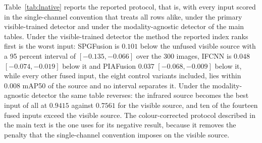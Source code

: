 \documentclass[11pt,a4paper]{article}
\begin{document}
Table~\ref{tab:lnative} reports the reported protocol, that is, with every input scored
in the single-channel convention that treats all rows alike, under the primary
visible-trained detector and under the modality-agnostic detector of the main tables.
Under the visible-trained detector the method the reported index ranks first is the
worst input: SPGFusion is $0.101$ below the unfused visible source with a 95 percent
interval of $[-0.135,-0.066]$ over the 300 images, IFCNN is $0.048$
$[-0.074,-0.019]$ below it and PIAFusion $0.037$ $[-0.068,-0.009]$ below it, while
every other fused input, the eight control variants included, lies within $0.008$
mAP50 of the source and no interval separates it. Under the modality-agnostic detector
the same table reverses: the infrared source becomes the best input of all at $0.9415$
against $0.7561$ for the visible source, and ten of the fourteen fused inputs exceed
the visible source. The colour-corrected protocol described in the main text is the one
uses for its negative result, because it removes the penalty that the single-channel
convention imposes on the visible source.
\end{document}
